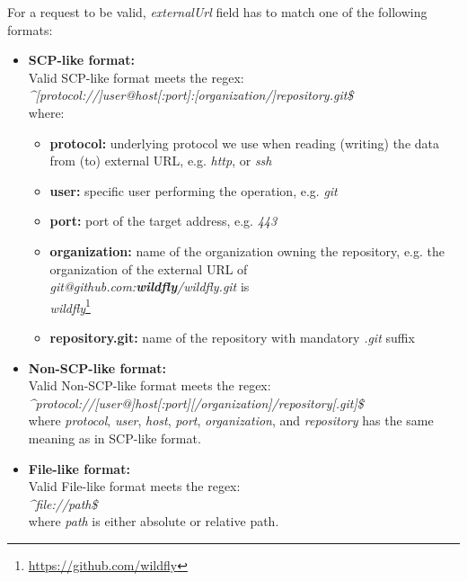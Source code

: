 \documentclass[../main.tex]{subfiles}
\begin{document}
For a request to be valid, \textit{externalUrl} field has to match one of the following formats:

\begin{itemize}
    \item \textbf{SCP-like format:}\\
    Valid SCP-like format meets the regex:\\
    \textit{\textasciicircum [protocol://]user@host[:port]:[organization/]repository.git\$}\\
    where:
    \begin{itemize}
        \item \textbf{protocol:} underlying protocol we use when reading (writing) the data from (to) external URL, e.g. \textit{http}, or \textit{ssh}

        \item \textbf{user:} specific user performing the operation, e.g. \textit{git}

        \item \textbf{port:} port of the target address, e.g. \textit{443}

        \item \textbf{organization:} name of the organization owning the repository, e.g. the organization of the external URL of\\ \textit{git@github.com:\textbf{wildfly}/wildfly.git} is\\
        \textit{wildfly}\footnote{\url{https://github.com/wildfly}}

        \item \textbf{repository.git:} name of the repository with mandatory \textit{.git} suffix
    \end{itemize}

    \item \textbf{Non-SCP-like format:}\\
    Valid Non-SCP-like format meets the regex:\\
    \textit{\textasciicircum protocol://[user@]host[:port][/organization]/repository[.git]\$}\\
    where \textit{protocol}, \textit{user}, \textit{host}, \textit{port}, \textit{organization}, and \textit{repository} has the same meaning as in SCP-like format.

    \item \textbf{File-like format:}\\
    Valid File-like format meets the regex:\\ \textit{\textasciicircum file://path\$}\\
    where \textit{path} is either absolute or relative path.
\end{itemize}
\end{document}
